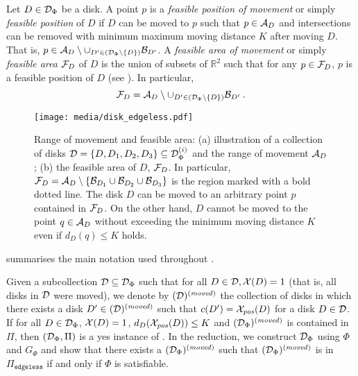 \begin{toappendix}
\begin{toappendix}
Let $D \in \mathcal{D}_\Phi$ be a disk.
A point $p$ is a \emph{feasible position of movement} or simply \emph{feasible position} of $D$ if $D$ can be moved to $p$ such that $p \in \mathcal{A}_D$ and intersections can be removed with minimum maximum moving distance $K$ after moving $D$.
That is,
    $p \in \mathcal{A}_D \setminus \cup_{D' \in \left(\mathcal{D}_\Phi\setminus\{D\}\right)}\mathcal{B}_{D'}$.
A \emph{feasible area of movement} or simply \emph{feasible area} $\mathcal{F}_D$ of $D$ is the union of subsets of $\mathbb{R}^2$ such that for any $p \in \mathcal{F}_D$, $p$ is a feasible position of $D$ (see ).
In particular, 
\[
        \mathcal{F}_D =  \mathcal{A}_D \setminus \cup_{D' \in \left(\mathcal{D}_\Phi\setminus\{D\}\right)}\mathcal{B}_{D'}\:.
\]


\begin{figure}[!htb]
    \centering
    \texttt{[image: media/disk\_edgeless.pdf]}
    \caption{Range of movement and feasible area: (a) illustration of a collection of disks $\mathcal{D} = \{D,D_1,D_2,D_3\} \subseteq \mathcal{D}^{(i)}_\Phi$ and the range of movement $\mathcal{A}_D$; (b) the feasible area of $D$, $\mathcal{F}_D$. In particular, $\mathcal{F}_D = \mathcal{A}_D \setminus \{\mathcal{B}_{D_1} \cup \mathcal{B}_{D_2} \cup \mathcal{B}_{D_3}\}$ is the region marked with a bold dotted line. The disk $D$ can be moved to an arbitrary point $p$ contained in $\mathcal{F}_D$. On the other hand, $D$ cannot be moved to the point $q \in \mathcal{A}_D$ without exceeding the minimum moving distance $K$ even if $d_D(q) \le K$ holds.}
    \label{fig:feasible_area}
\end{figure}

 summarises the main notation used throughout .



Given a subcollection $\mathcal{D} \subseteq \mathcal{D}_\Phi$ such that for all $D \in \mathcal{D}, \mathcal{X}(D) = 1$ (that is, all disks in $\mathcal{D}$ were moved), we denote by $(\mathcal{D})^{(\mathit{moved})}$ the collection of disks in which there exists a disk $D' \in (\mathcal{D})^{(\mathit{moved})}$ such that $c(D') = \mathcal{X}_{\mathit{pos}}(D)$ for a disk $D \in \mathcal{D}$.
If for all $D \in \mathcal{D}_\Phi$, $\mathcal{X}(D) = 1$, $d_D(\mathcal{X}_{\mathit{pos}}(D)) \le K$ and $(\mathcal{D}_\Phi)^{(\mathit{moved})}$ is contained in $\Pi$, then $(\mathcal{D}_\Phi,\Pi)$ is a yes instance of {\ggedmm}.
In the reduction, we construct $\mathcal{D}_\Phi$ using $\Phi$ and $G_\Phi$ and show that there exists a $(\mathcal{D}_\Phi)^{(\mathit{moved})}$ such that $(\mathcal{D}_\Phi)^{(\mathit{moved})}$ is in $\Pi_{\texttt{edgeless}}$ if and only if $\Phi$ is satisfiable.


\end{toappendix}
\end{toappendix}
